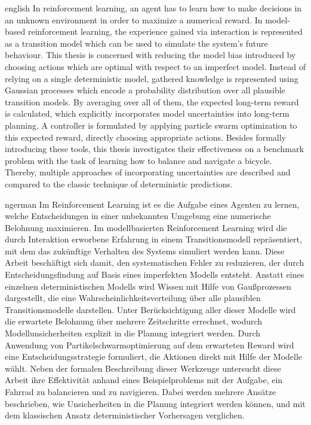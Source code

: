 \begin{Abstract}{english}
In reinforcement learning, an agent has to learn how to make decisions in an unknown environment in order to maximize a numerical reward.
In model-based reinforcement learning, the experience gained via interaction is represented as a transition model which can be used to simulate the system's future behaviour.
This thesis is concerned with reducing the model bias introduced by choosing actions which are optimal with respect to an imperfect model.
Instead of relying on a single deterministic model, gathered knowledge is represented using Gaussian processes which encode a probability distribution over all plausible transition models.
By averaging over all of them, the expected long-term reward is calculated, which explicitly incorporates model uncertainties into long-term planning.
A controller is formulated by applying particle swarm optimization to this expected reward, directly choosing appropriate actions.
Besides formally introducing these tools, this thesis investigates their effectiveness on a benchmark problem with the task of learning how to balance and navigate a bicycle.
Thereby, multiple approaches of incorporating uncertainties are described and compared to the classic technique of deterministic predictions.
\end{Abstract}

\begin{Abstract}{ngerman}
Im Reinforcement Learning ist es die Aufgabe eines Agenten zu lernen, welche Entscheidungen in einer unbekannten Umgebung eine numerische Belohnung maximieren.
Im modellbasierten Reinforcement Learning wird die durch Interaktion erworbene Erfahrung in einem Transitionsmodell repräsentiert, mit dem das zukünftige Verhalten des Systems simuliert werden kann.
Diese Arbeit beschäftigt sich damit, den systematischen Fehler zu reduzieren, der durch Entscheidungsfindung auf Basis eines imperfekten Modells entsteht.
Anstatt eines einzelnen deterministischen Modells wird Wissen mit Hilfe von Gaußprozessen dargestellt, die eine Wahrscheinlichkeitsverteilung über alle plausiblen Transitionsmodelle darstellen.
Unter Berücksichtigung aller dieser Modelle wird die erwartete Belohnung über mehrere Zeitschritte errechnet, wodurch Modellunsicherheiten explizit in die Planung integriert werden.
Durch Anwendung von Partikelschwarmoptimierung auf dem erwarteten Reward wird eine Entscheidungsstrategie formuliert, die Aktionen direkt mit Hilfe der Modelle wählt.
Neben der formalen Beschreibung dieser Werkzeuge untersucht diese Arbeit ihre Effektivität anhand eines Beispielproblems mit der Aufgabe, ein Fahrrad zu balancieren und zu navigieren.
Dabei werden mehrere Ansätze beschrieben, wie Unsicherheiten in die Planung integriert werden können, und mit dem klassischen Ansatz deterministischer Vorhersagen verglichen.
\end{Abstract}
